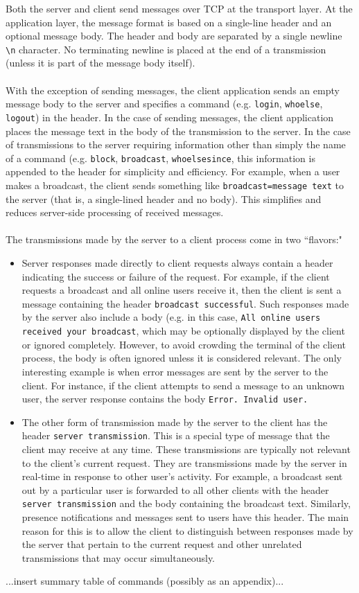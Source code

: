 \documentclass[12pt,a4paper]{article}
\begin{document}
Both the server and client send messages over TCP at the transport layer. At the application layer, the message format is based on a single-line header and an optional message body. The header and body are separated by a single newline \verb|\n| character. No terminating newline is placed at the end of a transmission (unless it is part of the message body itself).
\\\\
With the exception of sending messages, the client application sends an empty message body to the server and specifies a command (e.g. \verb|login|, \verb|whoelse|, \verb|logout|) in the header. In the case of sending messages, the client application places the message text in the body of the transmission to the server. In the case of transmissions to the server requiring information other than simply the name of a command (e.g. \verb|block|, \verb|broadcast|, \verb|whoelsesince|, this information is appended to the header for simplicity and efficiency. For example, when a user makes a broadcast, the client sends something like \verb|broadcast=message text| to the server (that is, a single-lined header and no body). This simplifies and reduces server-side processing of received messages.
\\\\
The transmissions made by the server to a client process come in two ``flavors:"
\begin{itemize}
	\item Server responses made directly to client requests always contain a header indicating the success or failure of the request. For example, if the client requests a broadcast and all online users receive it, then the client is sent a message containing the header \verb|broadcast successful|. Such responses made by the server also include a body (e.g. in this case, \verb|All online users received your broadcast|, which may be optionally displayed by the client or ignored completely. However, to avoid crowding the terminal of the client process, the body is often ignored unless it is considered relevant. The only interesting example is when error messages are sent by the server to the client. For instance, if the client attempts to send a message to an unknown user, the server response contains the body \verb|Error. Invalid user.|
	\item The other form of transmission made by the server to the client has the header \verb|server transmission|. This is a special type of message that the client may receive at any time. These transmissions are typically not relevant to the client's current request. They are transmissions made by the server in real-time in response to other user's activity. For example, a broadcast sent out by a particular user is forwarded to all other clients with the header \verb|server transmission| and the body containing the broadcast text. Similarly, presence notifications and messages sent to users have this header. The main reason for this is to allow the client to distinguish between responses made by the server that pertain to the current request and other unrelated transmissions that may occur simultaneously.
\end{itemize}
...insert summary table of commands (possibly as an appendix)...
\end{document}
